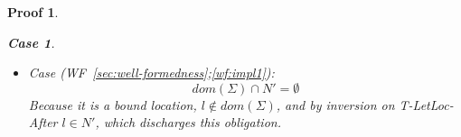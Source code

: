 \documentclass[showabstract,showacknowledgments,showpreface,showdedication,school]{iuphd}
\newtheorem*{bcase}{Case}
\theoremstyle{nonumberplain}
\newtheorem{nproof}{Proof}
\newcommand{\keywd}[1]{\mathit{#1}}
\newcommand{\skeywd}[1]{\mathit{#1}}
\newcommand{\DC}{\keywd{K}}
\newcommand{\loc}{\skeywd{l}}
\newcommand{\concreteloc}[3]{\ensuremath{\langle #1, #2 \rangle ^{#3}}}
\newcommand{\reg}{\skeywd{r}}
\newcommand{\indj}{\keywd{j}}
\newcommand{\STOR}{\keywd{S}}
\newcommand{\SENV}{\keywd{\Sigma}}
\newcommand{\MENV}{\keywd{M}}
\newcommand{\NENV}{\keywd{N}}
\newcommand{\allocptr}[2]{\keywd{MaxIdx}(#1,#2)}
\newcommand{\refwellformed}[2]{WF~\ref{#1};\ref{#2}}
\newcommand{\dletloctag}{D-LetLoc-Tag}
\newcommand{\dletlocafter}{D-LetLoc-After}
\newcommand{\tllafter}{T-LetLoc-After}
\begin{document}
\begin{nproof}
\begin{bcase}
\begin{itemize}
\begin{itemize}
\begin{itemize}
        This obligation discharges immediately because, by inversion on \tllafter{}, $\loc \in \NENV'$.
        \item Case (\refwellformed{sec:well-formedness-allocation}{wf:impl-write-once}):
        The proof obligation is to establish that, for any constructor tag $\DC$,
        \begin{align*}
         ((\loc \mapsto \concreteloc{\reg}{\indj}{}) \in \MENV' \wedge \\
          (\reg \mapsto (\indj \mapsto \DC)) \not \in \STOR)
        \end{align*}
        The first conjunct discharges by inversion on \dletlocafter{},
        and the second as a consequence of having already
        established just above that $\indj > \allocptr{\reg}{\STOR}$.
        \item Case (\refwellformed{sec:well-formedness-allocation}{wf:impl-empty-region}):
        This case discharges straightforwardly, in a similar fashion
        to the previous case, for \dletloctag{}.
        \end{itemize}
      \item
      Case (\refwellformed{sec:well-formedness}{wf:impl1}):
      \begin{displaymath}
      dom(\SENV) \cap \NENV' = \emptyset
      \end{displaymath}
      Because it is a bound location, $\loc \not \in dom(\SENV)$, and by inversion on \tllafter{}
      $\loc \in \NENV'$, which discharges this obligation.
      \end{itemize}
    \end{itemize}
  \end{bcase}


\end{nproof}
\end{document}
